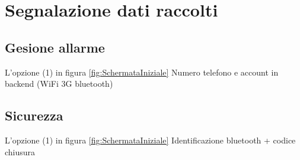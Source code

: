 \section {Segnalazione dati raccolti}
\subsection{Gesione allarme}
L'opzione (1) in figura \ref{fig:SchermataIniziale}
Numero telefono e account in backend (WiFi 3G bluetooth)
\subsection{Sicurezza}
L'opzione (1) in figura \ref{fig:SchermataIniziale}
Identificazione bluetooth + codice chiusura
